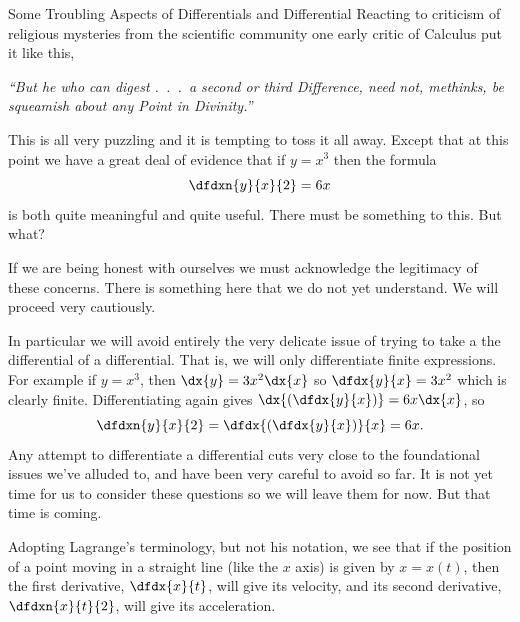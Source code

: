 \begin{mynotation}{Some Troubling Aspects of Differentials and Differential}
  Reacting to criticism of religious
  mysteries from the scientific community one early critic of Calculus put it
  like this,
\begin{center}
  \begin{minipage}{.75\linewidth}
    \it{}
    ``But he who can digest .\ .\ .\  a second or third
  Difference, need not, methinks, be squeamish about any Point in
  Divinity.''
\end{minipage}
\end{center}

This is all very puzzling and it is tempting to toss it all away.
Except that at this point we have a great deal of evidence that if
$y=x^3$ then the formula
$$
\dfdxn{y}{x}{2}=6x
$$
is both quite meaningful and quite useful. There must be something to
this. But what?

  If we are being honest with ourselves we must acknowledge the
  legitimacy of these concerns. There is something here that we do not
  yet understand. We will proceed very cautiously.

  In particular we will avoid entirely the very delicate issue of
  trying to take a the differential of a differential. That is, we
  will only differentiate finite expressions. For example if $y=x^3$,
  then $\dx{y}=3x^2\dx{x}$ so $\dfdx{y}{x}=3x^2$ which is clearly
  finite. Differentiating again gives
  $\dx{\left(\dfdx{y}{x}\right)}=6x\dx{x}$, so
  $$
  \dfdxn{y}{x}{2}=\dfdx{\left(\dfdx{y}{x}\right)}{x}=6x.
$$
Any attempt to differentiate a differential cuts very close to the
foundational issues we've alluded to, and have been very careful to
avoid so far. It is not yet time for us to consider these questions so
we will leave them for now. But that time is coming.
\end{mynotation}

Adopting Lagrange's terminology, but not his notation, we see that if
the position of a point moving in a straight line (like the $x$ axis)
is given by $x=x(t)$, then the first derivative, $\dfdx{x}{t}$, will
give its velocity, and its second derivative, $\dfdxn{x}{t}{2}$, will
give its acceleration.

